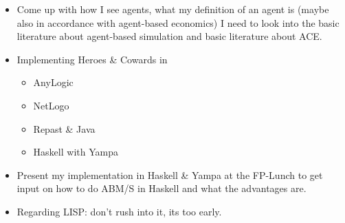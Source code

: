 \begin{itemize}
\item Come up with how I see agents, what my definition of an agent is (maybe also in accordance with agent-based economics) I need to look into the basic literature about agent-based simulation and basic literature about ACE.
\item Implementing Heroes \& Cowards in 

	\begin{itemize}
	\item AnyLogic
	\item NetLogo
	\item Repast \& Java
	\item Haskell with Yampa
	\end{itemize}

\item Present my implementation in Haskell \& Yampa at the FP-Lunch to get input on how to do ABM/S in Haskell and what the advantages are.
\item Regarding LISP: don't rush into it, its too early.
\end{itemize}